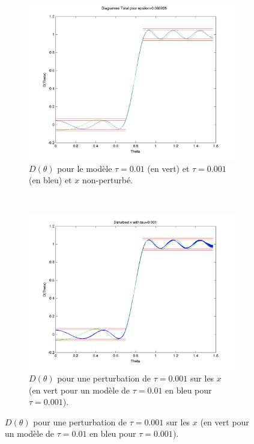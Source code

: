 \begin{figure}[h!]
  \centering
  \begin{subfigure}[b]{0.32\textwidth}
  \includegraphics[width=1.1\textwidth]{D-ModRobust1.png}
  \caption{$D(\theta)$ pour le modèle $\tau = 0.01$ (en vert) et $\tau = 0.001$ (en bleu) et $x$ non-perturbé.}
  \label{fig:D-ModRobust1}
  \end{subfigure}
  ~ 
 \begin{subfigure}[b]{0.32\textwidth}
  \includegraphics[width=1.1\textwidth]{D-ModRobust1-test3Rob001.png}
  \caption{$D(\theta)$ pour une perturbation de $\tau = 0.001$ sur les $x$ (en vert pour un modèle de $\tau=0.01$ en bleu pour $\tau=0.001$).}
  \label{fig:D-ModRobust1-test3RobTau001}

\end{subfigure}
\end{figure}
